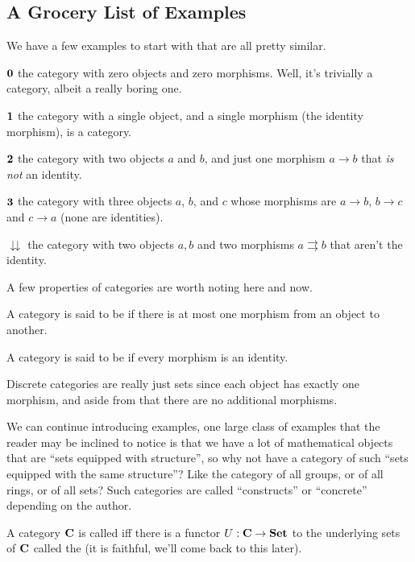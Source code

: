 \subsection{A Grocery List of Examples}

\begin{ex}We have a few examples to start with that are all pretty similar.

$\mathbf{0}$ the category with zero objects and zero morphisms. Well,
it's trivially a category, albeit a really boring one.

$\mathbf{1}$ the category with a single object, and a single morphism
(the identity morphism), is a category.

$\mathbf{2}$ the category with two objects $a$ and $b$, and just one 
morphism $a\to{}b$ that \emph{is not} an identity.

$\mathbf{3}$ the category with three objects $a$, $b$, and $c$ whose 
morphisms are $a\to{}b$, $b\to{}c$ and $c\to{}a$ (none are identities).

$\downdownarrows$ the category with two objects $a,b$ and 
two morphisms $a\rightrightarrows b$ that aren't the identity.
\end{ex}

A few properties of categories are worth noting here and now.

\begin{defn}\label{defn:thin}
A category is said to be  if there is at most one 
morphism from an object to another.
\end{defn}
\begin{defn}\label{defn:discrete}
A category is said to be  if every morphism is
an identity.
\end{defn}
Discrete categories are really just sets since each object has
exactly one morphism, and aside from that there are no additional
morphisms.

We can continue introducing examples, one large class of examples
that the reader may be inclined to notice is that we have a lot of
mathematical objects that are ``sets equipped with structure'', so
why not have a category of such ``sets equipped with the same 
structure''? Like the category of all groups, or of all rings, or
of all sets? Such categories are called ``constructs'' or ``concrete''
depending on the author.

\begin{defn}\label{defn:concreteCategory}
A category $\mathbf{C}$ is called  iff there is a functor
$U:\mathbf{C}\to\mathbf{Set}$ to the underlying sets of $\mathbf{C}$ called the
 (it is faithful, we'll come back to this 
later).
\end{defn}

